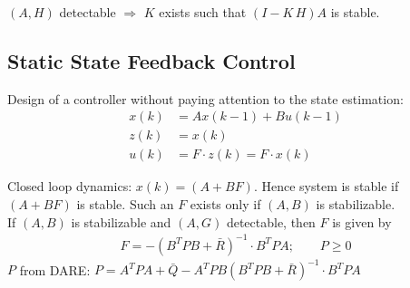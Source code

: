 \documentclass[landscape,a4paper,8pt]{scrartcl}
\begin{document}
\begin{multicols*}{3}
%
%

$(A,H)$ detectable $ \Rightarrow$ $K$ exists such that $(I-K \, H) A$ is stable.

\subsection{Static State Feedback Control}
Design of a controller without paying attention to the state estimation:
\begin{align*}
x(k) &= A x(k-1) + B u(k-1) \tag{Process without noise} \\
z(k) &= x(k)  \tag{Perfect State information} \\
u(k) &= F \cdot z(k) = F \cdot x(k) \tag{Control Law}
\end{align*}

Closed loop dynamics: $x(k) = (A+B F)$. Hence system is stable if $(A+B F)$ is stable. Such an $F$ exists only if $(A,B)$ is stabilizable. \\
If $(A,B)$ is stabilizable and $(A,G)$ detectable, then $F$ is given by
\begin{align*}
F = -(B^T P B + \bar{R})^{-1} \cdot B^T P A; \qquad P\geq 0
\end{align*}
$P$ from DARE: $P = A^T P A + \bar{Q} - A^T P B( B^T P B + \bar{R})^{-1} \cdot B^T P A$




\end{multicols*}
\end{document}
